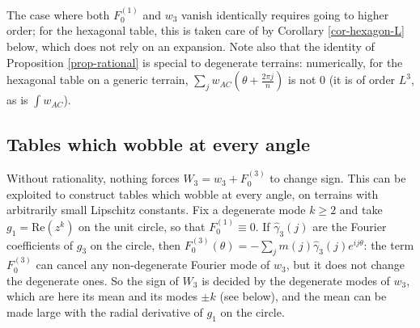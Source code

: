\documentclass[a4paper,11pt,twoside,leqno]{article}
\numberwithin{equation}{section}
\begin{document}
The case where both $F_0^{(1)}$ and $w_3$ vanish identically requires going to higher order; for the hexagonal table, this is taken care of by Corollary \ref{cor-hexagon-L} below, which does not rely on an expansion. Note also that the identity of Proposition \ref{prop-rational} is special to degenerate terrains: numerically, for the hexagonal table on a generic terrain, $\sum_j w_{AC}(\theta + \frac{2\pi j}{n})$ is not $0$ (it is of order $L^3$, as is $\int w_{AC}$).

\subsection{Tables which wobble at every angle}\label{ss-wobble}

Without rationality, nothing forces $W_3 = w_3 + F_0^{(3)}$ to change sign. This can be exploited to construct tables which wobble at every angle, on terrains with arbitrarily small Lipschitz constants. Fix a degenerate mode $k \geq 2$ and take $g_1 = \mathrm{Re}(z^k)$ on the unit circle, so that $F_0^{(1)} \equiv 0$. If $\hat\gamma_3(j)$ are the Fourier coefficients of $g_3$ on the circle, then $F_0^{(3)}(\theta) = -\sum_j m(j)\hat\gamma_3(j) e^{ij\theta}$: the term $F_0^{(3)}$ can cancel any non-degenerate Fourier mode of $w_3$, but it does not change the degenerate ones. So the sign of $W_3$ is decided by the degenerate modes of $w_3$, which are here its mean and its modes $\pm k$ (see below), and the mean can be made large with the radial derivative of $g_1$ on the circle.
\end{document}
